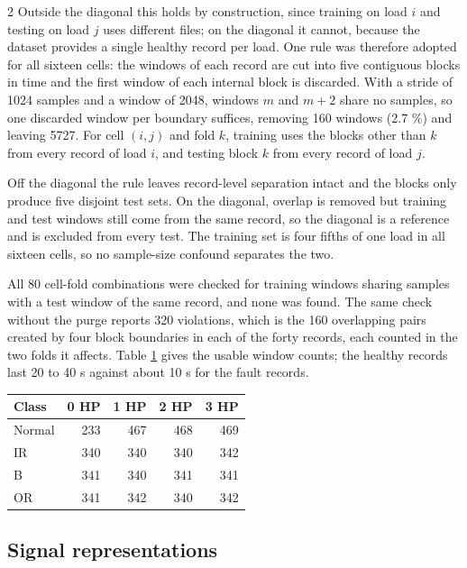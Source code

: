 \documentclass[12pt,twoside,titlepage]{ingenius}
\begin{document}
\begin{multicols}{2}
Outside the diagonal this holds by construction, since training on load $i$ and
testing on load $j$ uses different files; on the diagonal it cannot, because the
dataset provides a single healthy record per load. One rule was therefore
adopted for all sixteen cells: the windows of each record are cut into five
contiguous blocks in time and the first window of each internal block is
discarded. With a stride of 1024 samples and a window of 2048, windows $m$ and
$m+2$ share no samples, so one discarded window per boundary suffices, removing
160 windows (2.7 \%) and leaving 5727. For cell $(i,j)$ and fold $k$, training
uses the blocks other than $k$ from every record of load $i$, and testing block
$k$ from every record of load $j$.

Off the diagonal the rule leaves record-level separation intact and the blocks
only produce five disjoint test sets. On the diagonal, overlap is removed but
training and test windows still come from the same record, so the diagonal is a
reference and is excluded from every test. The training set is four fifths of
one load in all sixteen cells, so no sample-size confound separates the two.

All 80 cell-fold combinations were checked for training windows sharing samples
with a test window of the same record, and none was found. The same check
without the purge reports 320 violations, which is the 160 overlapping pairs
created by four block boundaries in each of the forty records, each counted in
the two folds it affects. Table \ref{tab:ventanas} gives the usable window
counts; the healthy records last 20 to 40 s against about 10 s for the fault
records.

\begin{table}[H]
\centering
{}
\label{tab:ventanas}
\begin{tabular}{lrrrr}
\toprule
Class & 0 HP & 1 HP & 2 HP & 3 HP \\
\midrule
Normal & 233 & 467 & 468 & 469 \\
IR     & 340 & 340 & 340 & 342 \\
B      & 341 & 340 & 341 & 341 \\
OR     & 341 & 342 & 340 & 342 \\
\bottomrule
\end{tabular}
\end{table}

\subsection{Signal representations}


\end{multicols}
\end{document}
